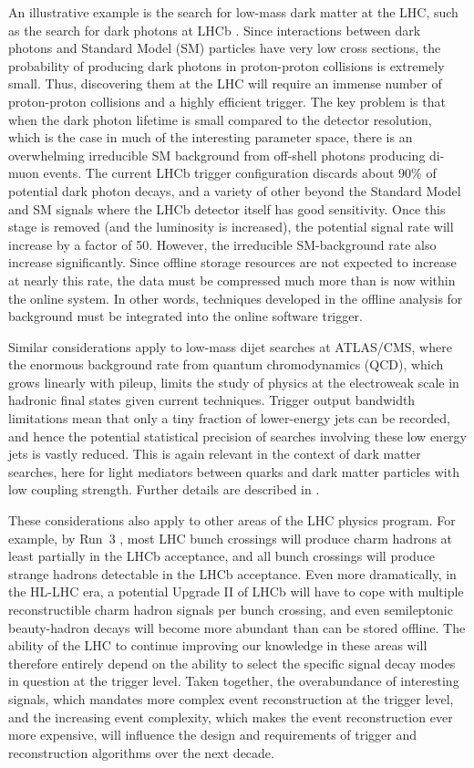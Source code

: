 An illustrative example is the search for low-mass dark matter at the LHC, such as the  search for dark photons at LHCb \cite{Ilten2016}.  Since interactions between dark photons and Standard Model 
(SM) particles have very low cross sections, the probability of producing dark photons in proton-proton collisions is extremely small. Thus, discovering them at the LHC will require an immense 
number of proton-proton collisions and a highly efficient trigger. The key problem is that when the dark photon lifetime is small compared to the detector resolution, which is the case in much 
of the interesting parameter space, there is an overwhelming irreducible SM background from off-shell photons producing di-muon events. The current LHCb trigger configuration discards about 
90\% of potential dark photon decays, and a variety of other beyond the Standard Model and SM signals where the LHCb detector itself has good sensitivity. Once this stage is removed (and the 
luminosity is increased), the potential signal rate will increase by a factor of 50. However, the irreducible SM-background rate also increase significantly. Since offline storage resources 
are not expected to increase at nearly this rate, the data must be compressed much more than is now within the online system. In other words, techniques developed in the offline analysis for 
background must be integrated into the online software trigger. 

Similar considerations apply to low-mass dijet searches at ATLAS/CMS, where the enormous background rate from quantum chromodynamics (QCD), which grows linearly with pileup, limits the study of 
physics at the electroweak scale in hadronic final states given current techniques. Trigger output bandwidth limitations mean that only a tiny fraction of lower-energy jets can be recorded, and 
hence the potential statistical precision of searches involving these low energy jets is vastly reduced. This is again relevant in the context of dark matter searches, here for light mediators 
between quarks and dark matter particles with low coupling strength. Further details are described in \cite{aTLAs2017, CMS2016}.

These considerations also apply to other areas of the LHC physics program. For example, by Run~3 \cite{LHCb2014}, most LHC bunch crossings will produce charm hadrons at least partially in the LHCb 
acceptance, and all bunch crossings will produce strange hadrons detectable in the LHCb acceptance. Even more dramatically, in the HL-LHC era, a potential Upgrade II of LHCb will have to cope 
with multiple reconstructible charm hadron signals per bunch crossing, and even semileptonic beauty-hadron decays will become more abundant than can be stored offline. The ability of the LHC to continue 
improving our knowledge in these areas will therefore entirely depend on the ability to select the specific signal decay modes in question at the trigger level. Taken together, the overabundance 
of interesting signals, which mandates more complex event reconstruction at the trigger level, and the increasing event complexity, which makes the event reconstruction ever more expensive, will 
influence the design and requirements of trigger and reconstruction algorithms over the next decade.


